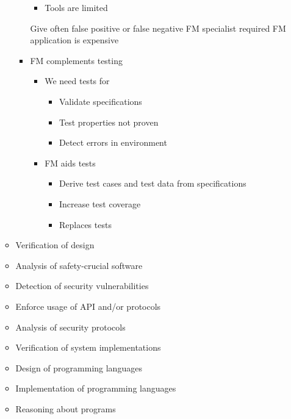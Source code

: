 \begin{itemize}
\begin{itemize}
\begin{itemize}
                        \begin{itemize}
                            \item Tools are limited
                        \end{itemize}
                    \icon Give often false positive or false negative
                    \icon FM specialist required
                    \icon FM application is expensive
                    \item FM complements testing
                        \begin{itemize}
                            \item We need tests for
                                \begin{itemize}
                                    \item Validate specifications
                                    \item Test properties not proven
                                    \item Detect errors in environment
                                \end{itemize}
                            \item FM aids tests
                                \begin{itemize}
                                    \item Derive test cases and test data from specifications
                                    \item Increase test coverage
                                    \item Replaces tests
                                \end{itemize}
                        \end{itemize}
                \end{itemize}
        \end{itemize}
        \begin{itemize}
            \item Verification of design
            \item Analysis of safety-crucial software
            \item Detection of security vulnerabilities
            \item Enforce usage of API and/or protocols
            \item Analysis of security protocols
            \item Verification of system implementations
            \item Design of programming languages
            \item Implementation of programming languages
            \item Reasoning about programs
        \end{itemize}
\end{itemize}
